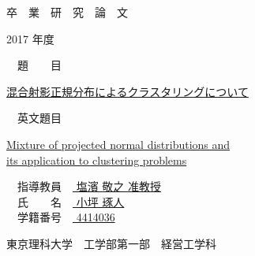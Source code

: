 \documentclass[a4j,11pt]{jarticle}
\begin{document}
\begin{center}
{\Huge 卒　業　研　究　論　文}
\end{center}
\vspace{2cm}
\begin{center}
{\huge 2017 年度}
\end{center}
\vspace{3cm}
\begin{flushleft}
{\huge　題　　目　}
\end{flushleft}
\begin{center}
{\huge \underline{混合射影正規分布によるクラスタリングについて}}\\
\end{center}
\begin{flushleft}
{\huge　英文題目　}
\end{flushleft}
\begin{center}
{\huge \underline{Mixture of projected normal distributions and}\\ \underline{its application to clustering problems}}\\
\end{center}
\vspace{5cm}
\begin{flushleft}
{\huge　指導教員　\underline{ 塩濱 敬之 准教授 }}\\
\vspace{5mm}
{\huge　氏　　名　\underline{ 小坪 琢人 }}\\
\vspace{5mm}
{\huge　学籍番号　\underline{ 4414036 }}
\end{flushleft}
\vspace{2cm}
\begin{flushright}
{\LARGE 東京理科大学　工学部第一部　経営工学科}\\
\end{flushright}
\end{document}
